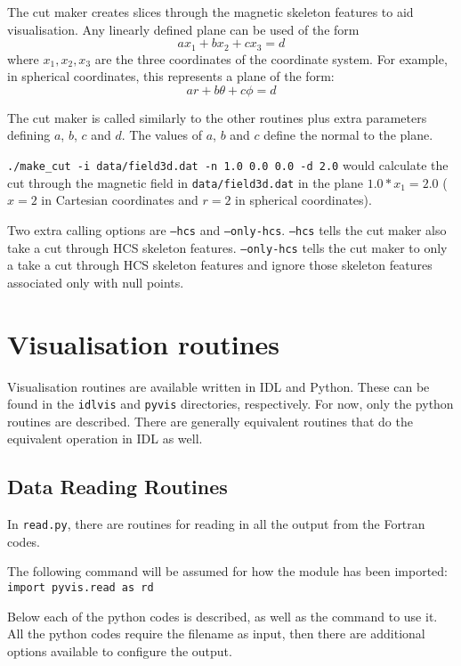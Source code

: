 \documentclass[12pt]{article}
\begin{document}
    The cut maker creates slices through the magnetic skeleton features to aid visualisation. Any linearly defined plane can be used of the form 
      \[ a x_1 + b x_2 + c x_3 = d \]
    where \( x_1, x_2, x_3 \) are the three coordinates of the coordinate system.
    For example, in spherical coordinates, this represents a plane of the form:
      \[ a r + b \theta + c \phi = d \]

    The cut maker is called similarly to the other routines plus extra parameters defining \( a \), \( b \), \( c \) and \( d \). The values of \( a \), \( b \) and \( c \) define the normal to the plane.

    \texttt{./make\_cut -i data/field3d.dat -n 1.0 0.0 0.0 -d 2.0}
    would calculate the cut through the magnetic field in \texttt{data/field3d.dat} in the plane \( 1.0*x_1 = 2.0 \) (\( x = 2 \) in Cartesian coordinates and \( r = 2 \) in spherical coordinates).

    Two extra calling options are \texttt{--hcs} and \texttt{--only-hcs}. \texttt{--hcs} tells the cut maker also take a cut through HCS skeleton features. \texttt{--only-hcs} tells the cut maker to only a take a cut through HCS skeleton features and ignore those skeleton features associated only with null points.

  \section{Visualisation routines}
    \label{sec:vis}

    Visualisation routines are available written in IDL and Python. These can be found in the \texttt{idlvis} and \texttt{pyvis} directories, respectively. For now, only the python routines are described. There are generally equivalent routines that do the equivalent operation in IDL as well.

    \subsection{Data Reading Routines}

      In \texttt{read.py}, there are routines for reading in all the output from the Fortran codes.

      The following command will be assumed for how the module has been imported:
      \texttt{import pyvis.read as rd}

      Below each of the python codes is described, as well as the command to use it. All the python codes require the filename as input, then there are additional options available to configure the output.
\end{document}
